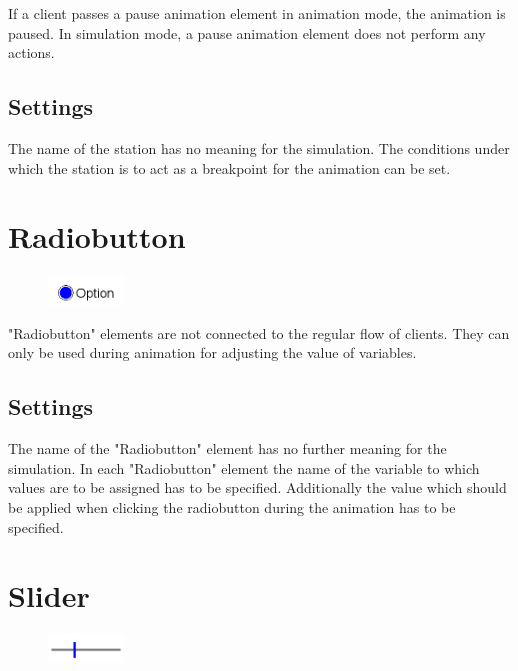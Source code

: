 If a client passes a pause animation element in animation mode, the animation is paused.
In simulation mode, a pause animation element does not perform any actions.

\subsection*{Settings}

The name of the station has no meaning for the simulation.
The conditions under which the station is to act as a breakpoint
for the animation can be set.


\section{Radiobutton}
\label{ref:ModelElementInteractiveRadiobutton}

\begin{figure}
\vspace{-22pt}
\includegraphics[width=2cm]{imageModelElementInteractiveRadiobutton.png}
\vspace{-22pt}
\end{figure}

"Radiobutton" elements are not connected to the regular flow of clients.
They can only be used during animation for adjusting the value of
variables.

\subsection*{Settings}

The name of the "Radiobutton" element has no further meaning for the simulation.
In each "Radiobutton" element the name of the variable to which values are to
be assigned has to be specified. Additionally the value which should be
applied when clicking the radiobutton during the animation has to be specified.  


\section{Slider}
\label{ref:ModelElementInteractiveSlider}

\begin{figure}
\vspace{-22pt}
\includegraphics[width=2cm]{imageModelElementInteractiveSlider.png}
\vspace{-22pt}
\end{figure}

